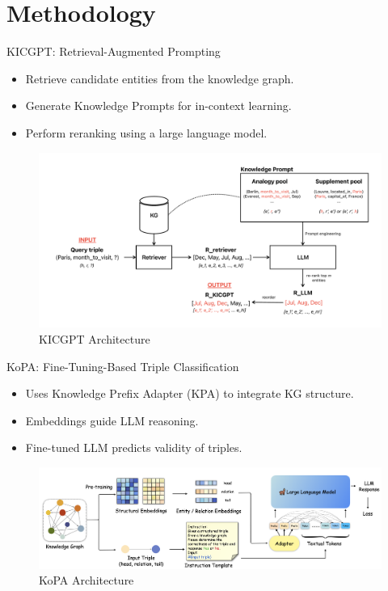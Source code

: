 \documentclass[aspectratio=169,xcolor=dvipsnames]{beamer}
\begin{document}
\section{Methodology}
\begin{frame}{KICGPT: Retrieval-Augmented Prompting}
    \begin{itemize}
        \item Retrieve candidate entities from the knowledge graph.
        \item Generate Knowledge Prompts for in-context learning.
        \item Perform reranking using a large language model.
    \end{itemize}
    \begin{figure}[h]
        \centering
        \includegraphics[width=0.8\linewidth]{images/KICGPT.pdf}
        \caption{KICGPT Architecture}
    \end{figure}
\end{frame}

\begin{frame}{KoPA: Fine-Tuning-Based Triple Classification}
    \begin{itemize}
        \item Uses Knowledge Prefix Adapter (KPA) to integrate KG structure.
        \item Embeddings guide LLM reasoning.
        \item Fine-tuned LLM predicts validity of triples.
    \end{itemize}
    \begin{figure}[h]
        \centering
        \includegraphics[width=0.8\linewidth]{images/KoPAarchitecture.png}
        \caption{KoPA Architecture}
    \end{figure}
\end{frame}
\end{document}
